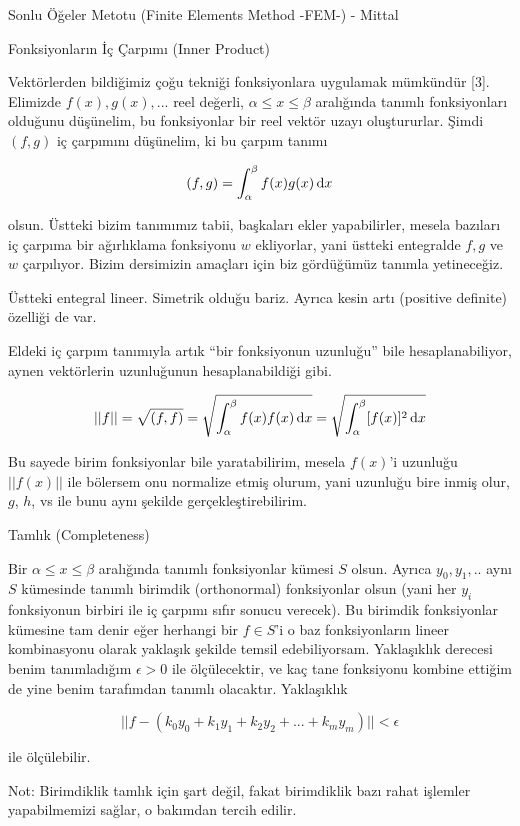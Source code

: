 \documentclass[12pt,fleqn]{article}\usepackage{../../common}
\begin{document}
Sonlu Öğeler Metotu (Finite Elements Method -FEM-) - Mittal

Fonksiyonların İç Çarpımı (Inner Product)

Vektörlerden bildiğimiz çoğu tekniği fonksiyonlara uygulamak mümkündür [3].
Elimizde $f(x), g(x), ...$ reel değerli, $\alpha \le x \le \beta$ aralığında
tanımlı fonksiyonları olduğunu düşünelim, bu fonksiyonlar bir reel vektör uzayı
oluştururlar. Şimdi $(f,g)$ iç çarpımını düşünelim, ki bu çarpım tanımı

$$
(f,g) = \int _{\alpha}^{\beta} f(x) g(x) \,\mathrm{d} x
$$

olsun. Üstteki bizim tanımımız tabii, başkaları ekler yapabilirler, mesela
bazıları iç çarpıma bir ağırlıklama fonksiyonu $w$ ekliyorlar, yani üstteki
entegralde $f,g$ ve $w$ çarpılıyor. Bizim dersimizin amaçları için biz
gördüğümüz tanımla yetineceğiz.

Üstteki entegral lineer. Simetrik olduğu bariz. Ayrıca kesin artı (positive
definite) özelliği de var.

Eldeki iç çarpım tanımıyla artık ``bir fonksiyonun uzunluğu'' bile
hesaplanabiliyor, aynen vektörlerin uzunluğunun hesaplanabildiği gibi.

$$
|| f || = \sqrt{ (f,f) } =
\sqrt{\int_{\alpha}^{\beta} f(x) f(x) \,\mathrm{d} x } =
\sqrt{\int_{\alpha}^{\beta} [f(x)]^2 \,\mathrm{d} x }
$$

Bu sayede birim fonksiyonlar bile yaratabilirim, mesela $f(x)$'i uzunluğu
$||f(x)||$ ile bölersem onu normalize etmiş olurum, yani uzunluğu bire inmiş
olur, $g$, $h$, vs ile bunu aynı şekilde gerçekleştirebilirim.

Tamlık (Completeness)

Bir $\alpha \le x \le \beta$ aralığında tanımlı fonksiyonlar kümesi $S$ olsun.
Ayrıca $y_0,y_1,..$ aynı $S$ kümesinde tanımlı birimdik (orthonormal)
fonksiyonlar olsun (yani her $y_i$ fonksiyonun birbiri ile iç çarpımı sıfır
sonucu verecek). Bu birimdik fonksiyonlar kümesine tam denir eğer herhangi bir
$f \in S$'i o baz fonksiyonların lineer kombinasyonu olarak yaklaşık şekilde
temsil edebiliyorsam. Yaklaşıklık derecesi benim tanımladığım $\epsilon > 0$ ile
ölçülecektir, ve kaç tane fonksiyonu kombine ettiğim de yine benim tarafımdan
tanımlı olacaktır. Yaklaşıklık

$$
|| f - (k_0 y_0 + k_1 y_1 + k_2 y_2 + ... + k_m y_m)  || < \epsilon
$$

ile ölçülebilir.

Not: Birimdiklik tamlık için şart değil, fakat birimdiklik bazı rahat işlemler
yapabilmemizi sağlar, o bakımdan tercih edilir.
\end{document}
